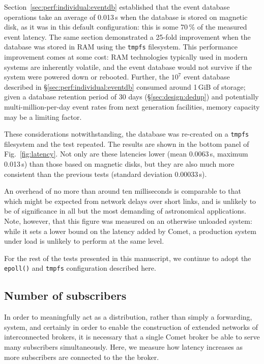 \documentclass[5p,authoryear]{elsarticle}
\begin{document}
Section~\ref{sec:perf:individual:eventdb} established that the event database
operations take an average of 0.013\,s when the database is stored on magnetic
disk, as it was in this default configuration: this is some 70\,\% of the
measured event latency. The same section demonstrated a 25-fold improvement
when the database was stored in RAM using the \texttt{tmpfs} filesystem. This
performance improvement comes at some cost: RAM technologies typically used in
modern systems are inherently volatile, and the event database would not
survive if the system were powered down or rebooted. Further, the $10^7$ event
database described in \S\ref{sec:perf:individual:eventdb} consumed around
1\,GiB of storage; given a database retention period of 30 days
(\S\ref{sec:design:dedup}) and potentially multi-million-per-day event rates
from next generation facilities, memory capacity may be a limiting factor.

These considerations notwithstanding, the database was re-created on a
\texttt{tmpfs} filesystem and the test repeated. The results are shown in the
bottom panel of Fig.~\ref{fig:latency}. Not only are these latencies lower
(mean 0.0063\,s, maximum 0.013\,s) than those based on magnetic disks, but
they are also much more consistent than the previous tests (standard deviation
0.00033\,s).

An overhead of no more than around ten milliseconds is comparable to that
which might be expected from network delays over short links, and is unlikely
to be of significance in all but the most demanding of astronomical
applications. Note, however, that this figure was measured on an otherwise
unloaded system: while it sets a lower bound on the latency added by Comet, a
production system under load is unlikely to perform at the same level.

For the rest of the tests presented in this manuscript, we continue to adopt
the \texttt{epoll()} and \texttt{tmpfs} configuration described here.

\subsection{Number of subscribers}

In order to meaningfully act as a distribution, rather than simply a
forwarding, system, and certainly in order to enable the construction of
extended networks of interconnected brokers, it is necessary that a single
Comet broker be able to serve many subscribers simultaneously. Here, we
measure how latency increases as more subscribers are connected to the the
broker.
\end{document}
